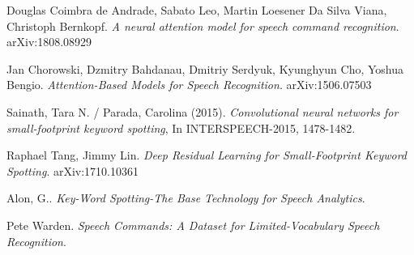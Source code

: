 \documentclass[conference]{IEEEtran}
\begin{document}
\begin{thebibliography}{1}
Douglas Coimbra de Andrade, Sabato Leo, Martin Loesener Da Silva Viana, Christoph Bernkopf. \textit{A neural attention model for speech command recognition}. arXiv:1808.08929

Jan Chorowski, Dzmitry Bahdanau, Dmitriy Serdyuk, Kyunghyun Cho, Yoshua Bengio. \textit{Attention-Based Models for Speech Recognition}. arXiv:1506.07503

Sainath, Tara N. / Parada, Carolina (2015). \textit{Convolutional neural networks for small-footprint keyword spotting}, In INTERSPEECH-2015, 1478-1482.

Raphael Tang, Jimmy Lin. \textit{Deep Residual Learning for Small-Footprint Keyword Spotting}. arXiv:1710.10361

Alon, G.. \textit{Key-Word Spotting-The Base Technology for Speech Analytics}.

Pete Warden. \textit{Speech Commands: A Dataset for Limited-Vocabulary Speech Recognition}.
\end{thebibliography}
\end{document}
